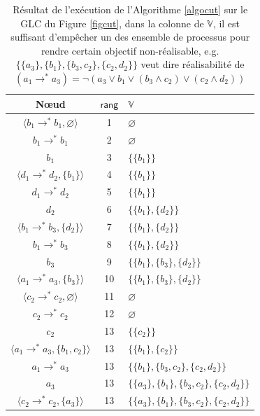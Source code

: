 \documentclass[11pt]{report}
\theoremstyle{definition}
\begin{document}
\begin{table}[ht]
\centering
\begin{tabular}{|c|c|l|}
 \hline 
 N\oe ud & $\mathsf{rang}$ & $\mathbb{V}$ \\ 
 \hline 
 $\langle b_1\to^*b_1,\varnothing\rangle$ & 1 & $\varnothing$ \\ 
 \hline 
 $b_1\to^*b_1$ & 2 & $\varnothing$ \\ 
 \hline 
 $b_1$ & 3 & $\{\{b_1\}\}$ \\ 
 \hline 
 $\langle d_1\to^*d_2,\{b_1\}\rangle$ & 4 & $\{\{b_1\}\}$ \\ 
 \hline 
 $d_1\to^*d_2$ & 5 & $\{\{b_1\}\}$ \\ 
 \hline 
 $d_2$ & 6 & $\{\{b_1\},\{d_2\}\}$ \\ 
 \hline 
 $\langle b_1\to^*b_3,\{d_2\}\rangle$ & 7 & $\{\{b_1\},\{d_2\}\}$ \\ 
 \hline 
 $b_1\to^*b_3$ & 8 & $\{\{b_1\},\{d_2\}\}$ \\ 
 \hline 
 $b_3$ & 9 & $\{\{b_1\},\{b_3\},\{d_2\}\}$ \\ 
 \hline 
 $\langle a_1\to^*a_3,\{b_3\}\rangle$ & 10 & $\{\{b_1\},\{b_3\},\{d_2\}\}$ \\ 
 \hline 
 $\langle c_2\to^*c_2,\varnothing\rangle$ & 11 & $\varnothing$ \\ 
 \hline 
 $c_2\to^*c_2$ & 12 & $\varnothing$ \\ 
 \hline 
 $c_2$ & 13 & $\{\{c_2\}\}$ \\ 
 \hline 
 $\langle a_1\to^*a_3,\{b_1,c_2\}\rangle$ & 13 & $\{\{b_1\},\{c_2\}\}$ \\ 
 \hline 
 $a_1\to^*a_3$ & 13 & $\{\{b_1\},\{b_3,c_2\},\{c_2,d_2\}\}$ \\ 
 \hline 
 $a_3$ & 13 & $\{\{a_3\},\{b_1\},\{b_3,c_2\},\{c_2,d_2\}\}$ \\ 
 \hline 
 $\langle c_2\to^*c_2,\{a_3\}\rangle$ & 13 & $\{\{a_3\},\{b_1\},\{b_3,c_2\},\{c_2,d_2\}\}$ \\ 
 \hline 
 \end{tabular}
 \caption{R\'esultat de l'ex\'ecution de l'Algorithme \ref{algocut} sur le GLC du Figure \ref{figcut}, dans la colonne de $\mathbb{V}$, il est suffisant d'emp\^echer un des ensemble de processus pour rendre certain objectif non-r\'ealisable, e.g.$\{\{a_3\},\{b_1\},\{b_3,c_2\},\{c_2,d_2\}\}$ veut dire r\'ealisabilit\'e de $(a_1\to^*a_3)=\lnot(a_3\lor b_1\lor(b_3\land c_2)\lor(c_2\land d_2))$}  
\end{table}
\end{document}
